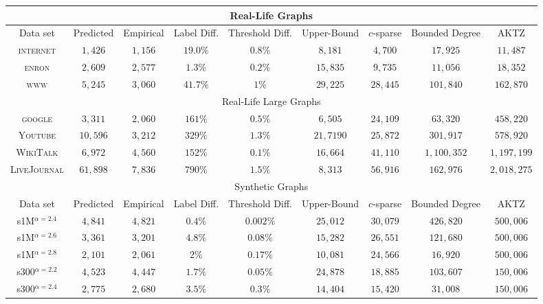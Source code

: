 \begin{table}
\small
\begin{tabular}{ccccccccc}
\hline \multicolumn{9}{c}{Real-Life Graphs}\\\hline
Data set&Predicted &Empirical & Label Diff. & Threshold Diff.   & Upper-Bound     &$c$-sparse &Bounded Degree \cite{adjiashvili2014labeling} &AKTZ \cite{alstrup2014adjacency}\\\hline
\textsc{internet}   &$1,426$    &$1,156$  & $19.0\%$  & $0.8\%$  & $8,181 $  &$4,700$      &$17,925$  &$11,487$\\
\textsc{enron}      &$2,609$    &$2,577$  & $1.3\%$ & $0.2\%$   & $15,835 $ &$9,735$      &$11,056$  &$18,352$\\
\textsc{www}        &$5,245$    &$3,060$  & $41.7\%$  & $1\%$  & $29,225 $ &$28,445$     &$101,840$ &$162,870$ \\
\hline \multicolumn{9}{c}{Real-Life Large Graphs}\\\hline
\textsc{google} & $3,311$ & $2,060$ & $161\%$ & $0.5\%$ & $6,505$ & $24,109$ & $63,320$ & $458,220$\\
\textsc{Youtube}        &$10,596$    &$3,212$  & $329\%$  & $1.3\%$  & $21,7190$ &$25,872$     &$301,917$ &$578,920$ \\
\textsc{WikiTalk}       & $6,972$ & $4,560$ & $152\%$ & $0.1\%$ & $16,664$ & $41,110$ & $1,100,352$ & $1,197,199$\\ 
\textsc{LiveJournal}        &$61,898$    &$7,836$  & $790\%$  & $1.5\%$  & $8,313$ &$56,916$     &$162,976$ &$2,018,275$ \\\hline
\multicolumn{9}{c}{Synthetic Graphs}\\\hline
Data set&Predicted &Empirical & Label Diff. & Threshold Diff.   & Upper-Bound     &$c$-sparse &Bounded Degree \cite{adjiashvili2014labeling} &AKTZ \cite{alstrup2014adjacency}\\\hline
s1M$^{\alpha=2.4}$  &$4,841$    &$4,821$  & $0.4\%$ & $0.002\%$  & $25,012 $ &$30,079$     &$426,820$ &$500,006$\\
s1M$^{\alpha=2.6}$  &$3,361$    &$3,201$   & $4.8\%$ & $0.08\%$  & $15,282 $ &$26,551$     &$121,680$ &$500,006$\\
s1M$^{\alpha=2.8}$  &$2,101$    &$2,061$    & $2\%$ & $0.17\%$  & $10,081 $ &$24,566$     &$16,920$  &$500,006$\\
s300$^{\alpha=2.2}$ &$4,523$    &$4,447$  & $1.7\%$ & $0.05\%$  & $24,878 $ &$18,885$     &$103,607$ &$150,006$\\
s300$^{\alpha=2.4}$ &$2,775$    &$2,680$   & $3.5\%$  & $0.3\%$ & $14,404 $ &$15,420$     &$31,008$  &$150,006$\\

\end{tabular}
\end{table}
